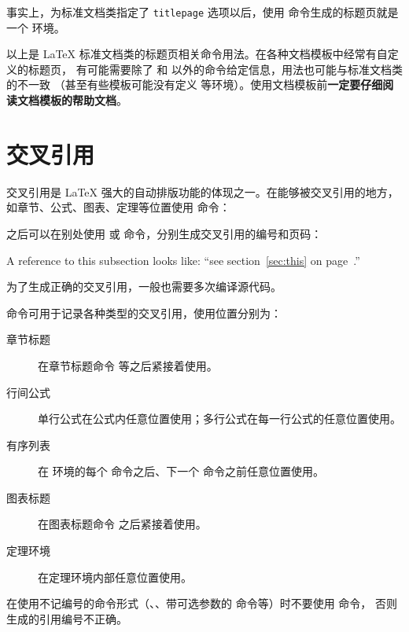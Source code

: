 事实上，为标准文档类指定了 \texttt{titlepage} 选项以后，使用  命令生成的标题页就是一个  环境。

以上是 \LaTeX{} 标准文档类的标题页相关命令用法。在各种文档模板中经常有自定义的标题页，
有可能需要除了  和  以外的命令给定信息，用法也可能与标准文档类的不一致
（甚至有些模板可能没有定义  等环境）。使用文档模板前\textbf{一定要仔细阅读文档模板的帮助文档}。

\section{交叉引用}\label{sec:crossref}

交叉引用是 \LaTeX{} 强大的自动排版功能的体现之一。在能够被交叉引用的地方，如章节、公式、图表、定理等位置使用  命令：
\begin{command}
\end{command}

之后可以在别处使用  或  命令，分别生成交叉引用的编号和页码：
\begin{command}
 \quad
{}
\end{command}
\begin{example}
A reference to this subsection
\label{sec:this} looks like:
``see section~\ref{sec:this} on
page~\pageref{sec:this}.''
\end{example}

为了生成正确的交叉引用，一般也需要多次编译源代码。

 命令可用于记录各种类型的交叉引用，使用位置分别为：
\begin{description}
  \item[章节标题] 在章节标题命令  等之后紧接着使用。
  \item[行间公式] 单行公式在公式内任意位置使用；多行公式在每一行公式的任意位置使用。
  \item[有序列表] 在  环境的每个  命令之后、下一个  命令之前任意位置使用。
  \item[图表标题] 在图表标题命令  之后紧接着使用。
  \item[定理环境] 在定理环境内部任意位置使用。
\end{description}

在使用不记编号的命令形式（、、带可选参数的  命令等）时不要使用  命令，
否则生成的引用编号不正确。

